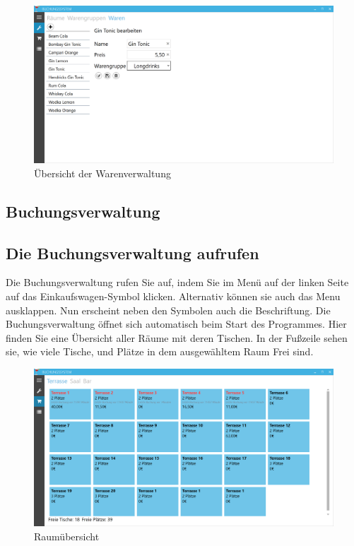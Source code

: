 \begin{figure}[h]
	\begin{center}
		\includegraphics[width=\columnwidth]{Benutzerhandbuch/Warenverwaltung.png}
	\end{center}
	\caption{Übersicht der Warenverwaltung}
	\label{fig:product-management}
\end{figure}

\subsection{Buchungsverwaltung}

\subsection{Die Buchungsverwaltung aufrufen}

Die Buchungsverwaltung rufen Sie auf, indem Sie im Menü auf der linken Seite auf das Einkaufswagen-Symbol klicken. Alternativ können sie auch das Menu ausklappen. Nun erscheint neben den Symbolen auch die Beschriftung.
Die Buchungsverwaltung öffnet sich automatisch beim Start des Programmes. 
Hier finden Sie eine Übersicht aller Räume mit deren Tischen. In der Fußzeile sehen sie, wie viele Tische, und Plätze in dem ausgewähltem Raum Frei sind.

\begin{figure}[h]
	\begin{center}
		\includegraphics[width=\columnwidth]{Benutzerhandbuch/Tischuebersicht.png}
	\end{center}
	\caption{Raumübersicht}
	\label{fig:room-overview}
\end{figure}


